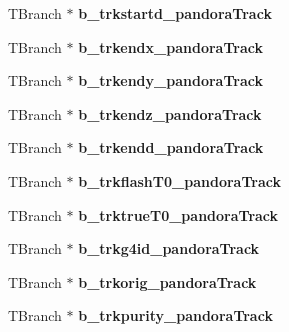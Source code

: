 \begin{DoxyCompactItemize}
\item 
\hypertarget{classanatree_a90eb713492fb0998f3508c75551dc4a6}{T\-Branch $\ast$ {\bfseries b\-\_\-trkstartd\-\_\-pandora\-Track}}\label{classanatree_a90eb713492fb0998f3508c75551dc4a6}

\item 
\hypertarget{classanatree_a81358c3f976dfbcac81bf4353469f51f}{T\-Branch $\ast$ {\bfseries b\-\_\-trkendx\-\_\-pandora\-Track}}\label{classanatree_a81358c3f976dfbcac81bf4353469f51f}

\item 
\hypertarget{classanatree_a153146777e062e05d088d634539342bb}{T\-Branch $\ast$ {\bfseries b\-\_\-trkendy\-\_\-pandora\-Track}}\label{classanatree_a153146777e062e05d088d634539342bb}

\item 
\hypertarget{classanatree_aba3d549c8f465fdb833a9b4887c3bc9d}{T\-Branch $\ast$ {\bfseries b\-\_\-trkendz\-\_\-pandora\-Track}}\label{classanatree_aba3d549c8f465fdb833a9b4887c3bc9d}

\item 
\hypertarget{classanatree_a1a62de7d92d5912ee306b6e4bf6938e7}{T\-Branch $\ast$ {\bfseries b\-\_\-trkendd\-\_\-pandora\-Track}}\label{classanatree_a1a62de7d92d5912ee306b6e4bf6938e7}

\item 
\hypertarget{classanatree_ae14f0aeac6cc6f497b5d59fe737dd838}{T\-Branch $\ast$ {\bfseries b\-\_\-trkflash\-T0\-\_\-pandora\-Track}}\label{classanatree_ae14f0aeac6cc6f497b5d59fe737dd838}

\item 
\hypertarget{classanatree_ae60d3999569dcc77d635c262660aedad}{T\-Branch $\ast$ {\bfseries b\-\_\-trktrue\-T0\-\_\-pandora\-Track}}\label{classanatree_ae60d3999569dcc77d635c262660aedad}

\item 
\hypertarget{classanatree_a3f806decdafb50f40f04e32e7d280f5b}{T\-Branch $\ast$ {\bfseries b\-\_\-trkg4id\-\_\-pandora\-Track}}\label{classanatree_a3f806decdafb50f40f04e32e7d280f5b}

\item 
\hypertarget{classanatree_aa4e2282952d618cc0fb28f98e02a292f}{T\-Branch $\ast$ {\bfseries b\-\_\-trkorig\-\_\-pandora\-Track}}\label{classanatree_aa4e2282952d618cc0fb28f98e02a292f}

\item 
\hypertarget{classanatree_a5566276bcad3e1cff7e2b6d24c202055}{T\-Branch $\ast$ {\bfseries b\-\_\-trkpurity\-\_\-pandora\-Track}}\label{classanatree_a5566276bcad3e1cff7e2b6d24c202055}


\end{DoxyCompactItemize}
